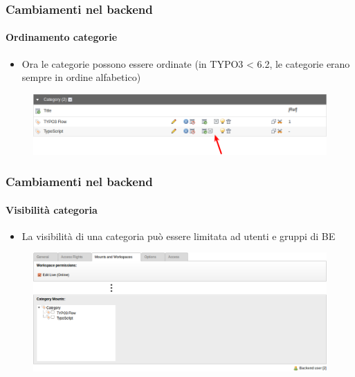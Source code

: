 
\begin{frame}[fragile]
	\frametitle{Cambiamenti nel backend}
	\framesubtitle{Ordinamento categorie}

 	\begin{itemize}
		\item Ora le categorie possono essere ordinate\newline
                        \small(in TYPO3 < 6.2, le categorie erano sempre in ordine alfabetico)\normalsize
	\end{itemize}

	\begin{figure}
		\includegraphics[width=0.95\linewidth]{Images/BackendChanges/CategorySorting.png}
	\end{figure}

\end{frame}


\begin{frame}[fragile]
	\frametitle{Cambiamenti nel backend}
	\framesubtitle{Visibilità categoria}

 	\begin{itemize}
		\item La visibilità di una categoria può essere limitata ad utenti e gruppi di BE
	\end{itemize}

	\begin{figure}
		\includegraphics[width=0.95\linewidth]{Images/BackendChanges/CategoryVisibility.png}
	\end{figure}

\end{frame}

